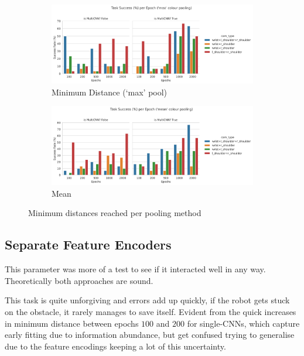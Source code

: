 \begin{figure}[htpb]
  \centering
  \begin{subfigure}{\linewidth}
    \centering
    \includegraphics[width=\linewidth]{assets/evaluation/cam-attn/ro_random-cam_attn-max-success.png}
    \caption{Minimum Distance (`max' pool)}\label{subfig:cam-attn-max-success-cnn}
  \end{subfigure}

  \begin{subfigure}{\linewidth}
    \centering
    \includegraphics[width=\linewidth]{assets/evaluation/cam-attn/ro_random-cam_attn-mean-success.png}
    \caption{Mean}\label{subfig:cam-attn-mean-success-cnn}
  \end{subfigure}
  \caption{Minimum distances reached per pooling method}\label{fig:cam-attn-success-cnn}
\end{figure}

\subsection{Separate Feature Encoders}
This parameter was more of a test to see if it interacted well in any way. Theoretically both approaches are sound. 

This task is quite unforgiving and errors add up quickly, if the robot gets stuck on the obstacle, it rarely manages to save itself. Evident from the quick increases in minimum distance between epochs $100$ and $200$ for single-CNNs, which capture early fitting due to information abundance, but get confused trying to generalise due to the feature encodings keeping a lot of this uncertainty.

